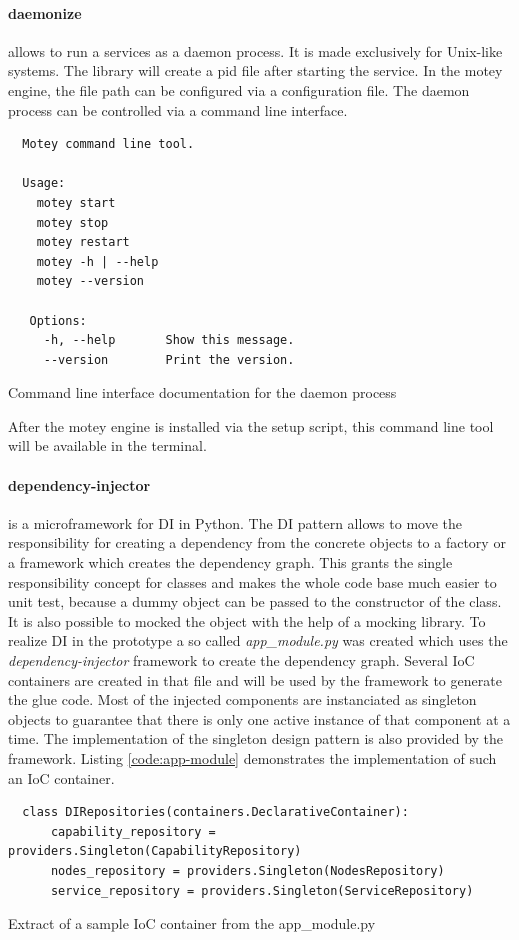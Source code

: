 \paragraph{daemonize} allows to run a services as a daemon process.
It is made exclusively for Unix-like systems.
The library will create a pid file after starting the service.
In the motey engine, the file path can be configured via a configuration file.
The daemon process can be controlled via a command line interface.
\begin{listing}[H]
  \begin{verbatim}
  Motey command line tool.

  Usage:
    motey start
    motey stop
    motey restart
    motey -h | --help
    motey --version

   Options:
     -h, --help       Show this message.
     --version        Print the version.
  \end{verbatim}
  \caption{Command line interface documentation for the daemon process}
  \label{code:cli-tool}
\end{listing}
After the motey engine is installed via the setup script, this command line tool will be available in the terminal.

\paragraph{dependency-injector} is a microframework for \acf{DI} in Python.
The \ac{DI} pattern allows to move the responsibility for creating a dependency from the concrete objects to a factory or a framework which creates the dependency graph.
This grants the single responsibility concept for classes and makes the whole code base much easier to unit test, because a dummy object can be passed to the constructor of the class.
It is also possible to mocked the object with the help of a mocking library.
To realize \ac{DI} in the prototype a so called \textit{app\_module.py} was created which uses the \textit{dependency-injector} framework to create the dependency graph.
Several \ac{IoC} containers are created in that file and will be used by the framework to generate the glue code.
Most of the injected components are instanciated as singleton objects to guarantee that there is only one active instance of that component at a time.
The implementation of the singleton design pattern is also provided by the framework.
Listing \ref{code:app-module} demonstrates the implementation of such an \ac{IoC} container.
\begin{listing}[H]
  \begin{verbatim}
  class DIRepositories(containers.DeclarativeContainer):
      capability_repository = providers.Singleton(CapabilityRepository)
      nodes_repository = providers.Singleton(NodesRepository)
      service_repository = providers.Singleton(ServiceRepository)
  \end{verbatim}
  \caption{Extract of a sample \ac{IoC} container from the app\_module.py}
  \label{code:app-module}
\end{listing}

